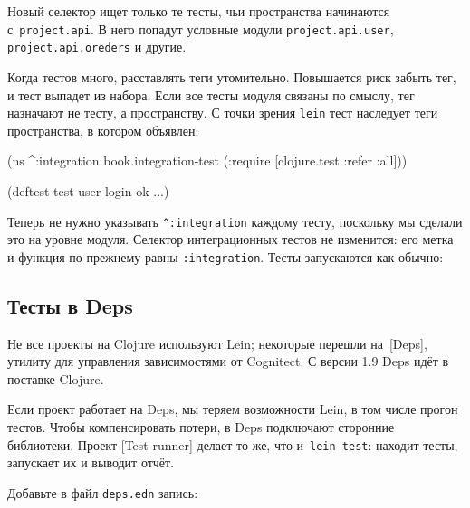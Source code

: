 \fi

Новый селектор ищет только те тесты, чьи пространства начинаются
с~\verb|project.api|. В него попадут условные модули \verb|project.api.user|,
\verb|project.api.oreders| и другие.

Когда тестов много, расставлять теги утомительно. Повышается риск забыть тег, и
тест выпадет из набора. Если все тесты модуля связаны по смыслу, тег назначают
не тесту, а пространству. С точки зрения \verb|lein| тест наследует теги
пространства, в котором объявлен:

\begin{english}
  \begin{clojure}
(ns ^:integration
  book.integration-test
  (:require [clojure.test :refer :all]))

(deftest test-user-login-ok
  ...)
  \end{clojure}
\end{english}

Теперь не нужно указывать \verb|^:integration| каждому тесту, поскольку мы
сделали это на уровне модуля. Селектор интеграционных тестов не изменится: его
метка и функция по-прежнему равны \verb|:integration|. Тесты запускаются как
обычно:

\begin{english}
\end{english}

\subsection{Тесты в Deps}


Не все проекты на Clojure используют Lein; некоторые перешли
на~[Deps],
утилиту для управления зависимостями от Cognitect. С версии 1.9 Deps идёт в
поставке Clojure.


Если проект работает на Deps, мы теряем возможности Lein, в том числе прогон
тестов. Чтобы компенсировать потери, в Deps подключают сторонние
библиотеки. Проект [Test runner]
делает то же, что и~\verb|lein test|: находит тесты, запускает их и выводит
отчёт.

Добавьте в файл \verb|deps.edn| запись:

